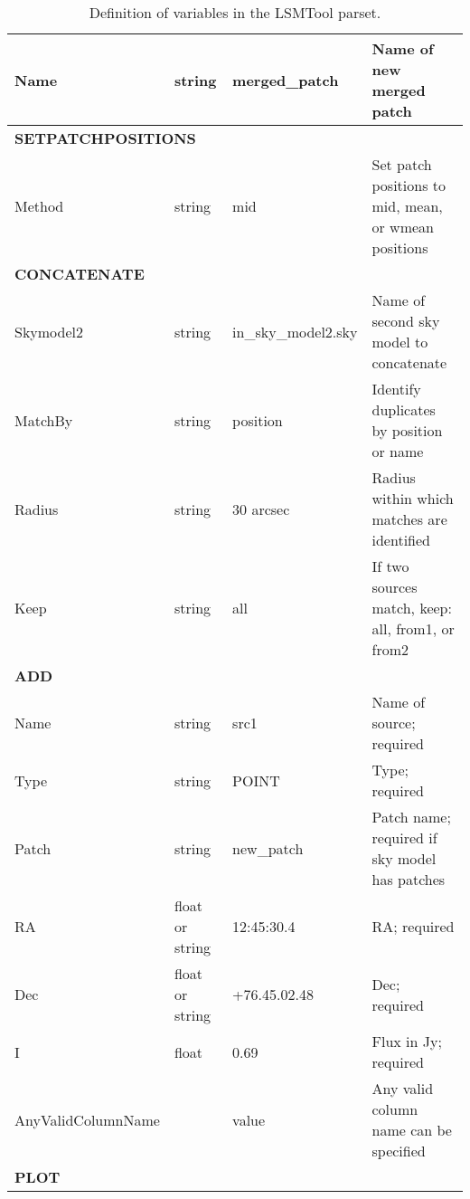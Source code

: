 \documentclass[structabstract]{article}
\begin{document}
\begin{table}[!ht]
\begin{tabular}{l l l l}
Name & string & merged\_patch & Name of new merged patch\\
\hline
\multicolumn{4}{l}{\textbf{SETPATCHPOSITIONS}}\\
Method & string & mid & Set patch positions to mid, mean, or wmean positions\\
\hline
\multicolumn{4}{l}{\textbf{CONCATENATE}}\\
Skymodel2 & string & in\_sky\_model2.sky & Name of second sky model to concatenate\\
MatchBy & string & position & Identify duplicates by position or name\\
Radius & string & 30 arcsec & Radius within which matches are identified\\
Keep & string & all & If two sources match, keep: all, from1, or from2\\
\hline
\multicolumn{4}{l}{\textbf{ADD}}\\
Name & string & src1 & Name of source; required\\
Type & string & POINT & Type; required\\
Patch & string & new\_patch & Patch name; required if sky model has patches\\
RA & float or string & 12:45:30.4 & RA; required\\
Dec & float or string & +76.45.02.48 & Dec; required\\
I & float & 0.69 & Flux in Jy; required\\
AnyValidColumnName & & value & Any valid column name can be specified\\
\hline
\multicolumn{4}{l}{\textbf{PLOT}}\\
\hline

\end{tabular}
\caption{Definition of variables in the LSMTool parset. \label{lsmtool:tab:local_val}}
\end{table}

\end{document}
